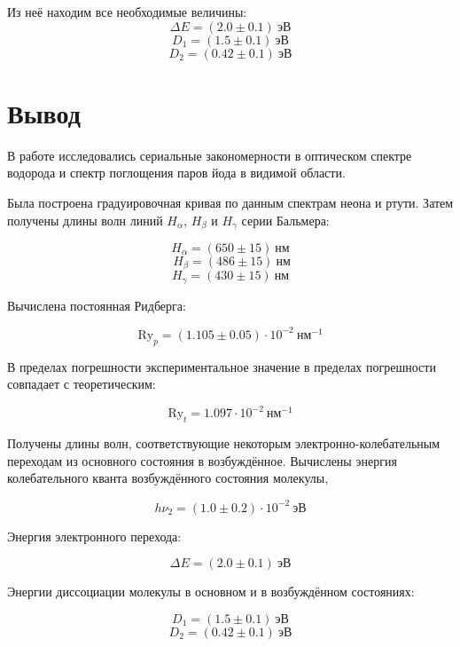 		Из неё находим все необходимые величины:
		\[ \Delta E=(2.0\pm 0.1) \ \text{эВ} \] 
        \[  D_1=(1.5\pm 0.1)\  \text{эВ}  \] 
        \[ D_2=(0.42\pm 0.1) \ \text{эВ} \]

    \section{Вывод}
	В работе исследовались сериальные закономерности в оптическом спектре водорода и спектр поглощения паров йода в видимой области.
	
    Была построена градуировочная кривая по данным спектрам неона и ртути. Затем получены длины волн линий $H_{\alpha}$, $H_{\beta}$ и $H_{\gamma}$ серии Бальмера:
    
    \[	H_{\alpha} = (650\pm 15)\ \text{нм} \]
    \[ \ H_{\beta} = (486\pm 15)\ \text{нм} \] 
    \[ H_{\gamma} = (430\pm  15)\  \text{нм} \]
		
    Вычислена постоянная Ридберга:
    
    \[ \text{Ry}_p=(1.105\pm 0.05)\cdot 10^{-2} ~\text{нм}^{-1} \]

    В пределах погрешности экспериментальное значение в пределах погрешности совпадает с теоретическим:

    \[ \text{Ry}_t=1.097\cdot 10^{-2} \ \text{нм}^{-1} \]
    
	
	Получены длины волн, соответствующие некоторым электронно-колебательным переходам из основного состояния в возбуждённое. Вычислены энергия колебательного кванта возбуждённого состояния молекулы, 
    
    \[	h\nu_2=(1.0\pm 0.2)\cdot 10^{-2} \ \text{эВ} \]
    
    Энергия электронного перехода:

    \[ \Delta E=(2.0\pm 0.1) \ \text{эВ} \] 
    
    Энергии диссоциации молекулы в основном и в возбуждённом состояниях:
	
    \[  D_1=(1.5\pm 0.1)\  \text{эВ}  \] 
    \[ D_2=(0.42\pm 0.1) \ \text{эВ} \]


